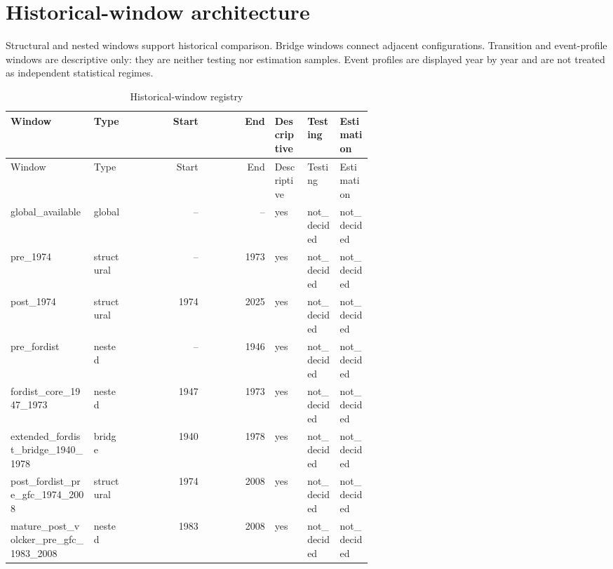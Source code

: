 \documentclass[11pt]{article}
\begin{document}
\section{Historical-window architecture}
Structural and nested windows support historical comparison. Bridge windows connect adjacent configurations. Transition and event-profile windows are descriptive only: they are neither testing nor estimation samples. Event profiles are displayed year by year and are not treated as independent statistical regimes.
\setcounter{table}{6}
\begin{center}
\tiny
\begin{longtable}{p{0.23\linewidth}p{0.10\linewidth}rrp{0.09\linewidth}p{0.09\linewidth}p{0.09\linewidth}}
\caption{Historical-window registry}\label{tab:windows}\\
\toprule
Window & Type & Start & End & Descriptive & Testing & Estimation \\
\midrule
\endfirsthead
\toprule
Window & Type & Start & End & Descriptive & Testing & Estimation \\
\midrule
\endhead
global\_\allowbreak{}available & global & -- & -- & yes & not\_\allowbreak{}decided & not\_\allowbreak{}decided \\
pre\_\allowbreak{}1974 & structural & -- & 1973 & yes & not\_\allowbreak{}decided & not\_\allowbreak{}decided \\
post\_\allowbreak{}1974 & structural & 1974 & 2025 & yes & not\_\allowbreak{}decided & not\_\allowbreak{}decided \\
pre\_\allowbreak{}fordist & nested & -- & 1946 & yes & not\_\allowbreak{}decided & not\_\allowbreak{}decided \\
fordist\_\allowbreak{}core\_\allowbreak{}1947\_\allowbreak{}1973 & nested & 1947 & 1973 & yes & not\_\allowbreak{}decided & not\_\allowbreak{}decided \\
extended\_\allowbreak{}fordist\_\allowbreak{}bridge\_\allowbreak{}1940\_\allowbreak{}1978 & bridge & 1940 & 1978 & yes & not\_\allowbreak{}decided & not\_\allowbreak{}decided \\
post\_\allowbreak{}fordist\_\allowbreak{}pre\_\allowbreak{}gfc\_\allowbreak{}1974\_\allowbreak{}2008 & structural & 1974 & 2008 & yes & not\_\allowbreak{}decided & not\_\allowbreak{}decided \\
mature\_\allowbreak{}post\_\allowbreak{}volcker\_\allowbreak{}pre\_\allowbreak{}gfc\_\allowbreak{}1983\_\allowbreak{}2008 & nested & 1983 & 2008 & yes & not\_\allowbreak{}decided & not\_\allowbreak{}decided \\

\end{longtable}
\end{center}
\end{document}
